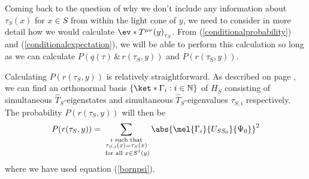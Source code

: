 \documentclass[12pt]{report}
\begin{document}
 Coming back to the question of why we don't include any information about $\tau_S(x)$ for $x\in S$ from within the light cone of $y$, we need to consider in more detail how we would calculate $\ev*{T^{\mu\nu}(y)}_{\tau_S}$. From (\ref{conditionalprobability}) and (\ref{conditionalexpectation}), we will be able to perform this calculation so long as we can calculate $P(q(\tau) \, \&\,  r(\tau_S,y))$ and $P(r(\tau_S,y))$. 
 
 Calculating $P(r(\tau_S,y))$ is relatively straightforward. As described on page \pageref{simultaneous}, we can find an orthonormal basis $\{\ket*{\Gamma_{i}}:i\in\mathbb{N}\}$ of $H_S$ consisting of simultaneous $\hat{T}_S$-eigenstates and simultaneous $\hat{T}_S$-eigenvalues $\tau_{S,i}$ respectively. The probability $P(r(\tau_S,y))$ will then be  
 \begin{equation}\label{rProb}
 P(r(\tau_S,y))=\sum_{\substack{i \text{ such that} \\ \tau_{S,i}(x)=\tau_S(x)\\ \text{ for all }x\in S^1(y)}}\abs{\mel{\Gamma_{i}}{U_{SS_0}}{\Psi_0}}^2
 \end{equation} where we have used equation (\ref{bornpsi}).
\end{document}
